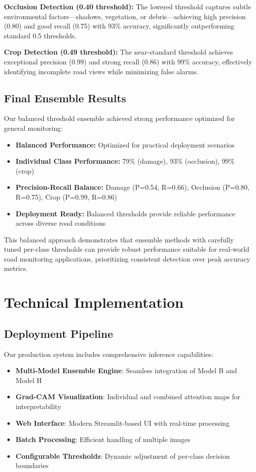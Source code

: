 \documentclass[12pt]{article}
\begin{document}
\textbf{Occlusion Detection (0.40 threshold):} The lowered threshold captures subtle environmental factors—shadows, vegetation, or debris—achieving high precision (0.80) and good recall (0.75) with 93\% accuracy, significantly outperforming standard 0.5 thresholds.

\textbf{Crop Detection (0.49 threshold):} The near-standard threshold achieves exceptional precision (0.99) and strong recall (0.86) with 99\% accuracy, effectively identifying incomplete road views while minimizing false alarms.

\subsection{Final Ensemble Results}

Our balanced threshold ensemble achieved strong performance optimized for general monitoring:

\begin{itemize}[itemsep=1pt,parsep=0pt,topsep=3pt]
\item \textbf{Balanced Performance:} Optimized for practical deployment scenarios
\item \textbf{Individual Class Performance:} 79\% (damage), 93\% (occlusion), 99\% (crop)
\item \textbf{Precision-Recall Balance:} Damage (P=0.54, R=0.66), Occlusion (P=0.80, R=0.75), Crop (P=0.99, R=0.86)
\item \textbf{Deployment Ready:} Balanced thresholds provide reliable performance across diverse road conditions
\end{itemize}

This balanced approach demonstrates that ensemble methods with carefully tuned per-class thresholds can provide robust performance suitable for real-world road monitoring applications, prioritizing consistent detection over peak accuracy metrics.

\section{Technical Implementation}

\subsection{Deployment Pipeline}

Our production system includes comprehensive inference capabilities:

\begin{itemize}[itemsep=1pt,parsep=0pt,topsep=3pt]
\item \textbf{Multi-Model Ensemble Engine}: Seamless integration of Model B and Model H
\item \textbf{Grad-CAM Visualization}: Individual and combined attention maps for interpretability
\item \textbf{Web Interface}: Modern Streamlit-based UI with real-time processing
\item \textbf{Batch Processing}: Efficient handling of multiple images
\item \textbf{Configurable Thresholds}: Dynamic adjustment of per-class decision boundaries
\end{itemize}
\end{document}
